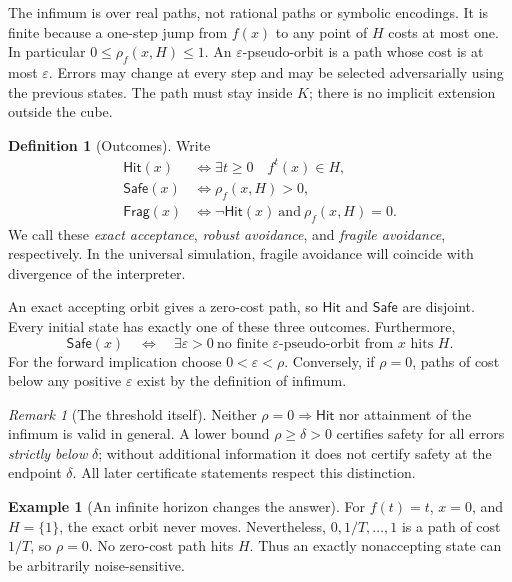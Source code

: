 \documentclass[11pt,letterpaper]{article}
\numberwithin{equation}{section}
\theoremstyle{definition}
\newtheorem{definition}[theorem]{Definition}
\newtheorem{example}[theorem]{Example}
\theoremstyle{remark}
\newtheorem{remark}[theorem]{Remark}
\newcommand{\Hit}{\mathsf{Hit}}
\newcommand{\Safe}{\mathsf{Safe}}
\newcommand{\Frag}{\mathsf{Frag}}
\begin{document}
The infimum is over real paths, not rational paths or symbolic encodings.  It
is finite because a one-step jump from $f(x)$ to any point of $H$ costs at most
one.  In particular $0\le\rho_f(x,H)\le1$.  An $\varepsilon$-pseudo-orbit is a
path whose cost is at most $\varepsilon$.  Errors may change at every step and
may be selected adversarially using the previous states.  The path must stay
inside $K$; there is no implicit extension outside the cube.

\begin{definition}[Outcomes]
Write
\begin{align*}
 \Hit(x)&\iff \exists t\ge0\quad f^t(x)\in H,\\
 \Safe(x)&\iff \rho_f(x,H)>0,\\
 \Frag(x)&\iff \neg\Hit(x)\ \text{and}\ \rho_f(x,H)=0.
\end{align*}
We call these \emph{exact acceptance}, \emph{robust avoidance}, and
\emph{fragile avoidance}, respectively.  In the universal simulation, fragile
avoidance will coincide with divergence of the interpreter.
\end{definition}

An exact accepting orbit gives a zero-cost path, so $\Hit$ and $\Safe$ are
disjoint.  Every initial state has exactly one of these three outcomes.
Furthermore,
\begin{equation}
 \Safe(x)\quad\Longleftrightarrow\quad
 \exists\varepsilon>0\ \text{no finite $\varepsilon$-pseudo-orbit from $x$ hits $H$}.
 \label{pqc:cb:eq:safety-equivalence}
\end{equation}
For the forward implication choose $0<\varepsilon<\rho$.  Conversely, if
$\rho=0$, paths of cost below any positive $\varepsilon$ exist by the definition
of infimum.

\begin{remark}[The threshold itself]
Neither $\rho=0\Rightarrow\Hit$ nor attainment of the infimum is valid in
general.  A lower bound $\rho\ge\delta>0$ certifies safety for all errors
\emph{strictly below} $\delta$; without additional information it does not
certify safety at the endpoint $\delta$.  All later certificate statements
respect this distinction.
\end{remark}

\begin{example}[An infinite horizon changes the answer]
For $f(t)=t$, $x=0$, and $H=\{1\}$, the exact orbit never moves.  Nevertheless,
$0,1/T,\ldots,1$ is a path of cost $1/T$, so $\rho=0$.  No zero-cost path hits
$H$.  Thus an exactly nonaccepting state can be arbitrarily noise-sensitive.
\end{example}
\end{document}
